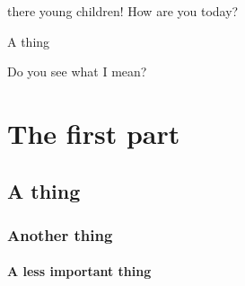  there young children! How are you today? \blindtext


\subparagraph{A thing} Do you see what I mean?
\part{The first part}

\chapter{A thing}

\blindtext
\section{Another thing}

\blindtext
\subsection{A less important thing}
\blindtext



